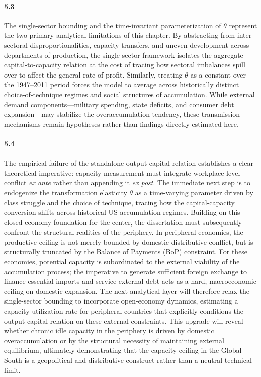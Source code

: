 \paragraph{5.3}
The single-sector bounding and the time-invariant parameterization of $\theta$ represent the two primary analytical limitations of this chapter. By abstracting from inter-sectoral disproportionalities, capacity transfers, and uneven development across departments of production, the single-sector framework isolates the aggregate capital-to-capacity relation at the cost of tracing how sectoral imbalances spill over to affect the general rate of profit. Similarly, treating $\theta$ as a constant over the 1947–2011 period forces the model to average across historically distinct choice-of-technique regimes and social structures of accumulation. While external demand components—military spending, state deficits, and consumer debt expansion—may stabilize the overaccumulation tendency, these transmission mechanisms remain hypotheses rather than findings directly estimated here.

\paragraph{5.4}
The empirical failure of the standalone output-capital relation establishes a clear theoretical imperative: capacity measurement must integrate workplace-level conflict \emph{ex ante} rather than appending it \emph{ex post}. The immediate next step is to endogenize the transformation elasticity $\theta$ as a time-varying parameter driven by class struggle and the choice of technique, tracing how the capital-capacity conversion shifts across historical US accumulation regimes. Building on this closed-economy foundation for the center, the dissertation must subsequently confront the structural realities of the periphery. In peripheral economies, the productive ceiling is not merely bounded by domestic distributive conflict, but is structurally truncated by the Balance of Payments (BoP) constraint. For these economies, potential capacity is subordinated to the external viability of the accumulation process; the imperative to generate sufficient foreign exchange to finance essential imports and service external debt acts as a hard, macroeconomic ceiling on domestic expansion. The next analytical layer will therefore relax the single-sector bounding to incorporate open-economy dynamics, estimating a capacity utilization rate for peripheral countries that explicitly conditions the output-capital relation on these external constraints. This upgrade will reveal whether chronic idle capacity in the periphery is driven by domestic overaccumulation or by the structural necessity of maintaining external equilibrium, ultimately demonstrating that the capacity ceiling in the Global South is a geopolitical and distributive construct rather than a neutral technical limit.

